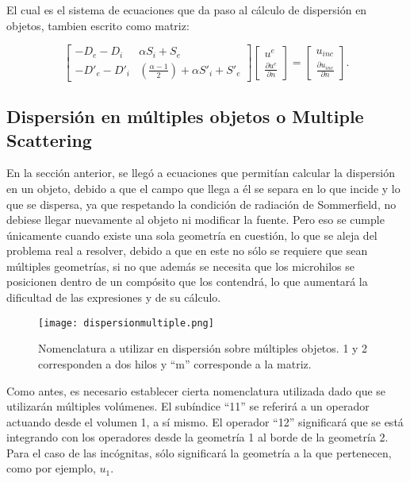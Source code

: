 \documentclass[12pt,letterpaper]{article}
\numberwithin{equation}{section}
\begin{document}
El cual es el sistema de ecuaciones que da paso al cálculo de dispersión en objetos, tambien escrito como matriz:

\begin{equation} 
\begin{bmatrix}
-D_{e} - D_{i} & \alpha S_{i} + S_{e}\\
-D'_{e} - D'_{i} & (\frac{\alpha - 1}{2})+\alpha S'_{i} + S'_{e}
\end{bmatrix}
\begin{bmatrix}
u^{e}\\
\frac{\partial u^{e}}{\partial n}
\end{bmatrix}
=
\begin{bmatrix}
u_{inc}\\
\frac{\partial u_{inc}}{\partial n}
\end{bmatrix}.
\label{eq:matriz trans}		 
\end{equation} 

\subsection{Dispersión en múltiples objetos o Multiple Scattering}


En la sección anterior, se llegó a ecuaciones que permitían calcular la dispersión en un objeto, debido a que el campo que llega a él se separa en lo que incide y lo que se dispersa, ya que respetando la condición de radiación de Sommerfield, no debiese llegar nuevamente al objeto ni modificar la fuente. Pero eso se cumple únicamente cuando existe una sola geometría en cuestión, lo que se aleja del problema real a resolver, debido a que en este no sólo se requiere que sean múltiples geometrías, si no que además se necesita que los microhilos se posicionen dentro de un compósito que los contendrá, lo que aumentará la dificultad de las expresiones y de su cálculo.

\begin{figure}[H]
	\centering\texttt{[image: dispersionmultiple.png]}
	\caption{Nomenclatura a utilizar en dispersión sobre múltiples objetos. 1 y 2 corresponden a dos hilos y ``m'' corresponde a la matriz.}
	\label{fig: dispersionmultiple}
\end{figure} 

Como antes, es necesario establecer cierta nomenclatura utilizada dado que se utilizarán múltiples volúmenes. El subíndice ``11'' se referirá a un operador actuando desde el volumen 1, a sí mismo. El operador ``12'' significará que se está integrando con los operadores desde la geometría 1 al borde de la geometría 2. Para el caso de las incógnitas, sólo significará la geometría a la que pertenecen, como por ejemplo, $u_{1}$. 
\end{document}
